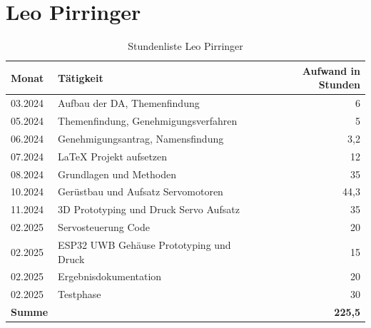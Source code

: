 \section*{Leo Pirringer}
\begin{table}[h]
	\begin{tabular}{p{2.5cm} p{10.5cm} r}
		\hline
		\textbf{Monat} & \textbf{Tätigkeit} & \textbf{Aufwand in Stunden} \\
		\hline
		03.2024 & Aufbau der DA, Themenfindung & 6 \\
		05.2024 & Themenfindung, Genehmigungsverfahren & 5 \\
		06.2024 & Genehmigungsantrag, Namensfindung & 3,2 \\
		07.2024 & LaTeX Projekt aufsetzen & 12 \\
		08.2024 & Grundlagen und Methoden & 35 \\
		10.2024 & Gerüstbau und Aufsatz Servomotoren & 44,3 \\
		11.2024 & 3D Prototyping und Druck Servo Aufsatz & 35 \\
		02.2025 & Servosteuerung Code & 20 \\
		02.2025 & ESP32 UWB Gehäuse Prototyping und Druck & 15 \\
		02.2025 & Ergebnisdokumentation & 20 \\
		02.2025 & Testphase & 30 \\
		\hline
		\textbf{Summe} & & \textbf{225,5} \\
		\hline
	\end{tabular}
	\caption{Stundenliste Leo Pirringer}
	\label{tab:arbeitsaufwand_Pirringer}
\end{table}
